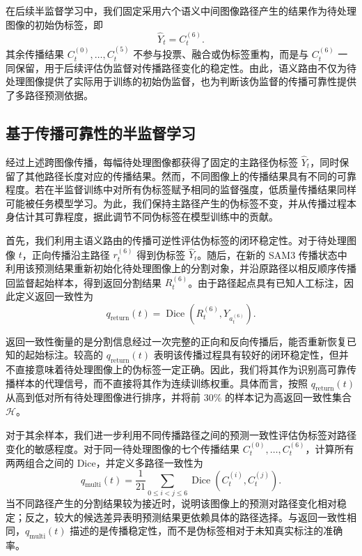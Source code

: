 \documentclass[UTF8,a4paper,10pt,twocolumn]{ctexart}
\begin{document}
在后续半监督学习中，我们固定采用六个语义中间图像路径产生的结果作为待处理图像的初始伪标签，即
\begin{equation}
\widehat{Y}_t
=
C_t^{(6)}.
\end{equation}
其余传播结果 $C_t^{(0)},\ldots,C_t^{(5)}$ 不参与投票、融合或伪标签重构，而是与 $C_t^{(6)}$ 一同保留，用于后续评估伪监督对传播路径变化的稳定性。由此，语义路由不仅为待处理图像提供了实际用于训练的初始伪监督，也为判断该伪监督的传播可靠性提供了多路径预测依据。







\subsection{基于传播可靠性的半监督学习}
\label{sec:reliability-learning}

经过上述跨图像传播，每幅待处理图像都获得了固定的主路径伪标签 $\widehat{Y}_t$，同时保留了其他路径长度对应的传播结果。然而，不同图像上的传播结果具有不同的可靠程度。若在半监督训练中对所有伪标签赋予相同的监督强度，低质量传播结果同样可能被任务模型学习。为此，我们保持主路径产生的伪标签不变，并从传播过程本身估计其可靠程度，据此调节不同伪标签在模型训练中的贡献。

首先，我们利用主语义路由的传播可逆性评估伪标签的闭环稳定性。对于待处理图像 $t$，正向传播沿主路径 $r_t^{(6)}$ 得到伪标签 $\widehat{Y}_t$。随后，在新的 SAM3 传播状态中利用该预测结果重新初始化待处理图像上的分割对象，并沿原路径以相反顺序传播回监督起始样本，得到返回分割结果 $R_t^{(6)}$。由于路径起点具有已知人工标注，因此定义返回一致性为
\begin{equation}
q_{\mathrm{return}}(t)
=
\operatorname{Dice}
\left(
R_t^{(6)},
Y_{a_t^{(6)}}
\right).
\end{equation}

返回一致性衡量的是分割信息经过一次完整的正向和反向传播后，能否重新恢复已知的起始标注。较高的 $q_{\mathrm{return}}(t)$ 表明该传播过程具有较好的闭环稳定性，但并不直接意味着待处理图像上的伪标签一定正确。因此，我们将其作为识别高可靠传播样本的代理信号，而不直接将其作为连续训练权重。具体而言，按照 $q_{\mathrm{return}}(t)$ 从高到低对所有待处理图像进行排序，并将前 $30\%$ 的样本记为高返回一致性集合 $\mathcal{H}$。

对于其余样本，我们进一步利用不同传播路径之间的预测一致性评估伪标签对路径变化的敏感程度。对于同一待处理图像的七个传播结果 $C_t^{(0)},\ldots,C_t^{(6)}$，计算所有两两组合之间的 Dice，并定义多路径一致性为
\begin{equation}
q_{\mathrm{multi}}(t)
=
\frac{1}{21}
\sum_{0\le i<j\le6}
\operatorname{Dice}
\left(
C_t^{(i)},
C_t^{(j)}
\right).
\end{equation}
当不同路径产生的分割结果较为接近时，说明该图像上的预测对路径变化相对稳定；反之，较大的候选差异表明预测结果更依赖具体的路径选择。与返回一致性相同，$q_{\mathrm{multi}}(t)$ 描述的是传播稳定性，而不是伪标签相对于未知真实标注的准确率。
\end{document}
